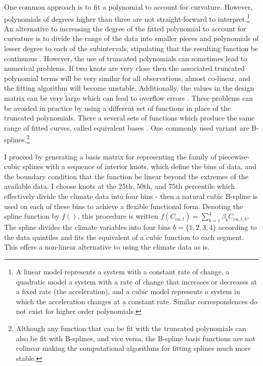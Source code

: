 \documentclass[a4paper,12pt]{article}
\theoremstyle{plain}
\theoremstyle{definition}
\theoremstyle{definition}
\theoremstyle{definition}
\theoremstyle{definition}
\begin{document}
One common approach is to fit a polynomial to account for curvature. However, polynomials of degrees higher than three are not straight-forward to interpret.\footnote{A linear model represents a system with a constant rate of change, a quadratic model a system with a rate of change that increases or decreases at a fixed rate (the acceleration), and a cubic model represents a system in which the acceleration changes at a constant rate. Similar correspondences do not exist for higher order polynomials.} An alternative to increasing the degree of the fitted polynomial to account for curvature is to divide the range of the data into smaller pieces and polynomials of lesser degree to each of the subintervals, stipulating that the resulting function be continuous \citep[see e.g.][pp. 275- 279]{greene2018}. However, the use of truncated polynomials can sometimes lead to numerical problems. If two knots are very close then the associated truncated polynomial terms will be very similar for all observations, almost co-linear, and the fitting algorithm will become unstable. Additionally, the values in the design matrix can be very large which can lead to overflow errors \citep[see e.g.,][]{hastie2009a}. These problems can be avoided in practice by using a different set of functions in place of the truncated polynomials. There a several sets of functions which produce the same range of fitted curves, called equivalent bases \citep{hastie1987,hastie2009a}. One commonly used variant are B-splines.\footnote{Although any function that can be fit with the truncated polynomials can also be fit with B-splines, and vice versa, the B-spline basis functions are not colinear making the computational algorithms for fitting splines much more stable.}  

I proceed by generating a basis matrix for representing the family of piecewise-cubic splines with a sequence of interior knots, which define the bins of data, and the boundary condition that the function be linear beyond the extremes of the available data. I choose knots at the 25th, 50th, and 75th percentile which effectively divide the climate data into four bins - then a natural cubic B-spline is used on each of these bins to achieve a flexible functional form. Denoting the spline function by $f()$, this procedure is written $f(C_{ea,t})=\sum_{b=1}^4 \beta_b C_{ea,t,b}$. The spline divides the climate variables into four bins $b=\{1,2,3,4\}$ according to the data quintiles and fits the equivalent of a cubic function to each segment. This offers a non-linear alternative to using the climate data as is.
\end{document}
